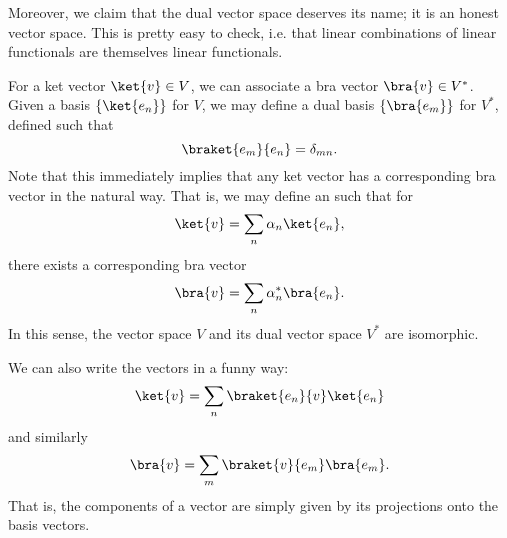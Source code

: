 Moreover, we claim that the dual vector space deserves its name; it is an honest vector space. This is pretty easy to check, i.e. that linear combinations of linear functionals are themselves linear functionals.

For a ket vector $\ket{v}\in V$, we can associate a bra vector $\bra{v}\in V^*$. Given a basis $\set{\ket{e_n}}$ for $V$, we may define a dual basis $\set{\bra{e_m}}$ for $V^*$, defined such that
\begin{equation}
    \braket{e_m}{e_n}=\delta_{mn}.
\end{equation}
Note that this immediately implies that any ket vector has a corresponding bra vector in the natural way. That is, we may define an  such that for
\begin{equation}
    \ket{v}=\sum_n \alpha_n \ket{e_n},
\end{equation}
there exists a corresponding bra vector
\begin{equation}
    \bra{v}=\sum_n \alpha_n^* \bra{e_n}.
\end{equation}
In this sense, the vector space $V$ and its dual vector space $V^*$ are isomorphic.

We can also write the vectors in a funny way:
\begin{equation}
    \ket{v}=\sum_n \braket{e_n}{v}\ket{e_n}
\end{equation}
and similarly
\begin{equation}
    \bra{v} =\sum_m \braket{v}{e_m} \bra{e_m}.
\end{equation}
That is, the components of a vector are simply given by its projections onto the basis vectors.